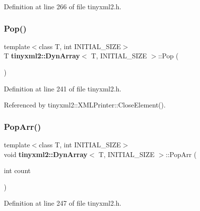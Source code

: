 Definition at line 266 of file tinyxml2.\+h.

\mbox{\label{classtinyxml2_1_1_dyn_array_a27a3f2f6f869815b6eabb3ea40cf0712}} 
\subsubsection{Pop()}
{\footnotesize\ttfamily template$<$class T, int I\+N\+I\+T\+I\+A\+L\+\_\+\+S\+I\+ZE$>$ \\
T \textbf{ tinyxml2\+::\+Dyn\+Array}$<$ T, I\+N\+I\+T\+I\+A\+L\+\_\+\+S\+I\+ZE $>$\+::Pop (\begin{DoxyParamCaption}{ }\end{DoxyParamCaption})\hspace{0.3cm}{\ttfamily [inline]}}



Definition at line 241 of file tinyxml2.\+h.



Referenced by tinyxml2\+::\+X\+M\+L\+Printer\+::\+Close\+Element().

\mbox{\label{classtinyxml2_1_1_dyn_array_ab8b8c94a2312ab27e2846f0d61ef677a}} 
\subsubsection{PopArr()}
{\footnotesize\ttfamily template$<$class T, int I\+N\+I\+T\+I\+A\+L\+\_\+\+S\+I\+ZE$>$ \\
void \textbf{ tinyxml2\+::\+Dyn\+Array}$<$ T, I\+N\+I\+T\+I\+A\+L\+\_\+\+S\+I\+ZE $>$\+::Pop\+Arr (\begin{DoxyParamCaption}\item[{int}]{count }\end{DoxyParamCaption})\hspace{0.3cm}{\ttfamily [inline]}}



Definition at line 247 of file tinyxml2.\+h.

\mbox{\label{classtinyxml2_1_1_dyn_array_aea7ffe983b5d3284bd43171afd7c99d0}} 
